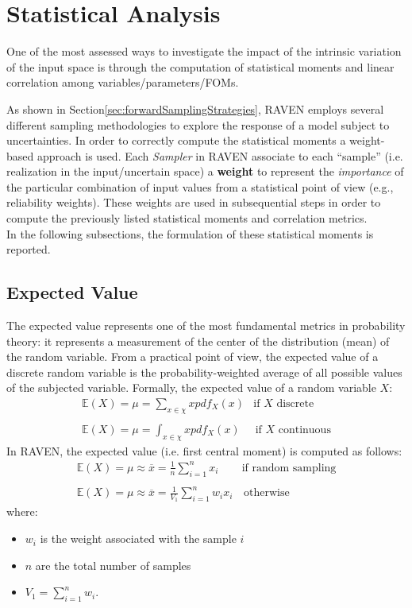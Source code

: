 \section{Statistical Analysis}
\label{sec:statisticalAnalysis}
One of the most assessed ways to investigate the impact of the intrinsic variation of the input space is through the computation of
statistical moments and linear correlation among variables/parameters/FOMs.

As shown in Section\ref{sec:forwardSamplingStrategies}, RAVEN employs several different sampling methodologies to explore the response of a model subject to uncertainties. In order to correctly compute the statistical moments a weight-based approach is used. Each \textit{Sampler} in RAVEN associate to each ``sample'' (i.e.
realization in the input/uncertain space) a \textbf{weight}  to represent the \textit{importance} of the particular
combination of input values from a statistical point of view (e.g., reliability weights). These weights are used in subsequential
steps in order to compute the previously listed statistical moments and correlation metrics.
\\In the following subsections, the formulation of these statistical moments is reported.
\subsection{Expected Value}
The expected value represents one of the most fundamental metrics in probability theory: it represents a measurement of the center of the distribution (mean) of the random variable.
From a practical point of view, the expected value of a discrete random variable is the probability-weighted average of all possible values of the subjected variable. Formally, the expected value of a random variable $X$:
\begin{equation}
\begin{matrix}
\mathbb{E}(X) = \mu = \sum_{x \in \chi} x  pdf_{X}(x) & \text{if  $X$  discrete} \\
\\
\mathbb{E}(X) = \mu = \int_{x \in \chi} x pdf_{X}(x) & \, \text{if $X$ continuous}
\end{matrix}
\end{equation}
In RAVEN, the expected value (i.e. first central moment) is computed as follows:
\begin{equation}
\begin{matrix}
\mathbb{E}(X) = \mu \approx \overline{x} = \frac{1}{n} \sum_{i=1}^{n}  x_{i} & \text{if  random sampling} \\
\\
\mathbb{E}(X) = \mu \approx \overline{x} = \frac{1}{V_{1}} \sum_{i=1}^{n} w_{i}  x_{i}  & \, \text{otherwise}
\end{matrix}
\end{equation}
where:
\begin{itemize}
  \item $w_{i}$ is the weight associated with the sample $i$
  \item $n$ are the total number of samples
  \item $V_{1} = \sum_{i=1}^{n} w_{i}$.
\end{itemize}
